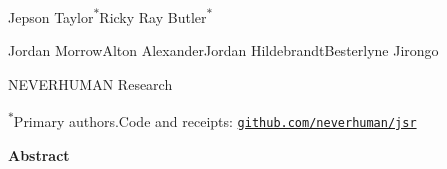 \documentclass[10pt,letterpaper,twocolumn]{article}
\begin{document}
\onecolumn
\thispagestyle{front}
\vspace*{-0.40in}
\begin{center}
{\bfseries\fontsize{18.5}{22}\selectfont\color{ink}\PaperTitle\par}
\vspace{5pt}
{\fontsize{12.5}{15}\selectfont\color{ink}\PaperDescriptor\par}
\vspace{11pt}
{\fontsize{10.6}{14}\selectfont\color{ink}Jepson Taylor\textsuperscript{$\ast$}\hspace{2em}Ricky Ray Butler\textsuperscript{$\ast$}\par
Jordan Morrow\hspace{1.6em}Alton Alexander\hspace{1.6em}Jordan Hildebrandt\hspace{1.6em}Besterlyne Jirongo\par}
\vspace{4pt}
{\fontsize{9.8}{12}\selectfont\color{ink}NEVERHUMAN Research\par}
\vspace{3pt}
{\fontsize{8.6}{11}\selectfont\color{sub}\textsuperscript{$\ast$}Primary authors.\hspace{1.2em}Code and receipts: \href{https://github.com/neverhuman/jsr}{\texttt{github.com/neverhuman/jsr}}\par}
\end{center}
\vspace{7pt}
\begin{center}
\begin{minipage}{0.88\textwidth}
{\centering\bfseries\fontsize{10}{12}\selectfont Abstract\par}\vspace{4pt}
\fontsize{9.6}{12.2}\selectfont\noindent

\end{minipage}
\end{center}
\vspace{4pt}


\twocolumn












\end{document}
